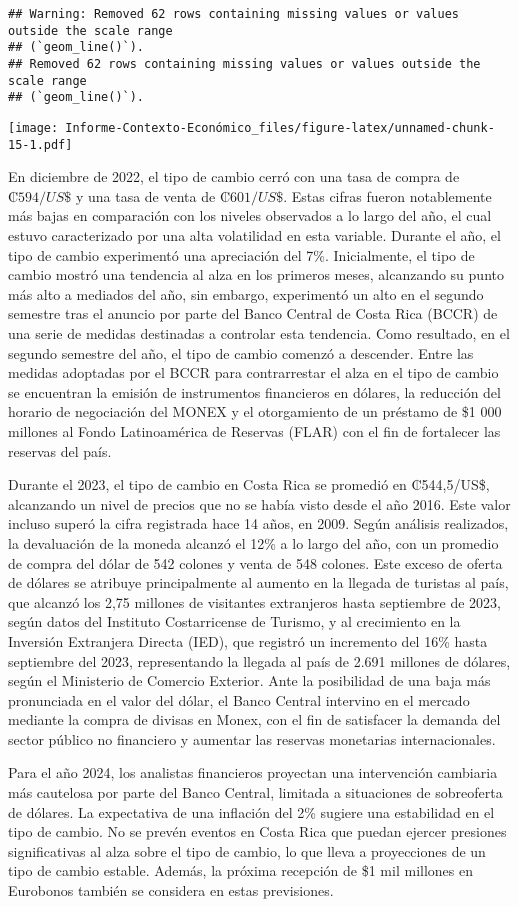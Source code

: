 \documentclass[
]{article}
\begin{document}
\begin{verbatim}
## Warning: Removed 62 rows containing missing values or values outside the scale range
## (`geom_line()`).
## Removed 62 rows containing missing values or values outside the scale range
## (`geom_line()`).
\end{verbatim}

\texttt{[image: Informe-Contexto-Económico\_files/figure-latex/unnamed-chunk-15-1.pdf]}

En diciembre de 2022, el tipo de cambio cerró con una tasa de compra de
\(₡594/US\$\) y una tasa de venta de \(₡601/US\$\). Estas cifras fueron
notablemente más bajas en comparación con los niveles observados a lo
largo del año, el cual estuvo caracterizado por una alta volatilidad en
esta variable. Durante el año, el tipo de cambio experimentó una
apreciación del 7\%. Inicialmente, el tipo de cambio mostró una
tendencia al alza en los primeros meses, alcanzando su punto más alto a
mediados del año, sin embargo, experimentó un alto en el segundo
semestre tras el anuncio por parte del Banco Central de Costa Rica
(BCCR) de una serie de medidas destinadas a controlar esta tendencia.
Como resultado, en el segundo semestre del año, el tipo de cambio
comenzó a descender. Entre las medidas adoptadas por el BCCR para
contrarrestar el alza en el tipo de cambio se encuentran la emisión de
instrumentos financieros en dólares, la reducción del horario de
negociación del MONEX y el otorgamiento de un préstamo de \$1 000
millones al Fondo Latinoamérica de Reservas (FLAR) con el fin de
fortalecer las reservas del país.

Durante el 2023, el tipo de cambio en Costa Rica se promedió en
₡544,5/US\$, alcanzando un nivel de precios que no se había visto desde
el año 2016. Este valor incluso superó la cifra registrada hace 14 años,
en 2009. Según análisis realizados, la devaluación de la moneda alcanzó
el 12\% a lo largo del año, con un promedio de compra del dólar de 542
colones y venta de 548 colones. Este exceso de oferta de dólares se
atribuye principalmente al aumento en la llegada de turistas al país,
que alcanzó los 2,75 millones de visitantes extranjeros hasta septiembre
de 2023, según datos del Instituto Costarricense de Turismo, y al
crecimiento en la Inversión Extranjera Directa (IED), que registró un
incremento del 16\% hasta septiembre del 2023, representando la llegada
al país de 2.691 millones de dólares, según el Ministerio de Comercio
Exterior. Ante la posibilidad de una baja más pronunciada en el valor
del dólar, el Banco Central intervino en el mercado mediante la compra
de divisas en Monex, con el fin de satisfacer la demanda del sector
público no financiero y aumentar las reservas monetarias
internacionales.

Para el año 2024, los analistas financieros proyectan una intervención
cambiaria más cautelosa por parte del Banco Central, limitada a
situaciones de sobreoferta de dólares. La expectativa de una inflación
del 2\% sugiere una estabilidad en el tipo de cambio. No se prevén
eventos en Costa Rica que puedan ejercer presiones significativas al
alza sobre el tipo de cambio, lo que lleva a proyecciones de un tipo de
cambio estable. Además, la próxima recepción de \$1 mil millones en
Eurobonos también se considera en estas previsiones.
\end{document}
